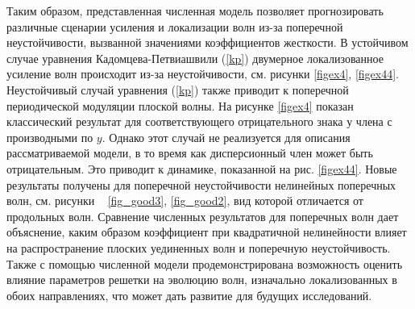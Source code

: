 Таким образом, представленная численная модель позволяет прогнозировать различные сценарии усиления и локализации волн из-за поперечной неустойчивости, вызванной значениями коэффициентов жесткости. В устойчивом случае уравнения Кадомцева-Петвиашвили (\ref {kp}) двумерное локализованное усиление волн происходит из-за неустойчивости, см. рисунки \ref {figex4}, \ref {figex44}. Неустойчивый случай уравнения (\ref {kp}) также приводит к поперечной периодической модуляции плоской волны. На рисунке \ref {figex4} показан классический результат для соответствующего отрицательного знака у члена с производными по $ y $. Однако этот случай не реализуется для описания рассматриваемой модели, в то время как дисперсионный член может быть отрицательным. Это приводит к динамике, показанной на рис. \ref{figex44}. Новые результаты получены для поперечной неустойчивости нелинейных поперечных волн, см. рисунки ~ \ref {fig_good3}, \ref{fig_good2}, вид которой отличается от продольных волн. Сравнение численных результатов для поперечных волн дает объяснение, каким образом коэффициент при квадратичной нелинейности влияет на распространение плоских уединенных волн и поперечную неустойчивость. Также с помощью численной модели продемонстрирована возможность оценить влияние параметров решетки на эволюцию волн, изначально локализованных в обоих направлениях, что может дать развитие для будущих исследований.
